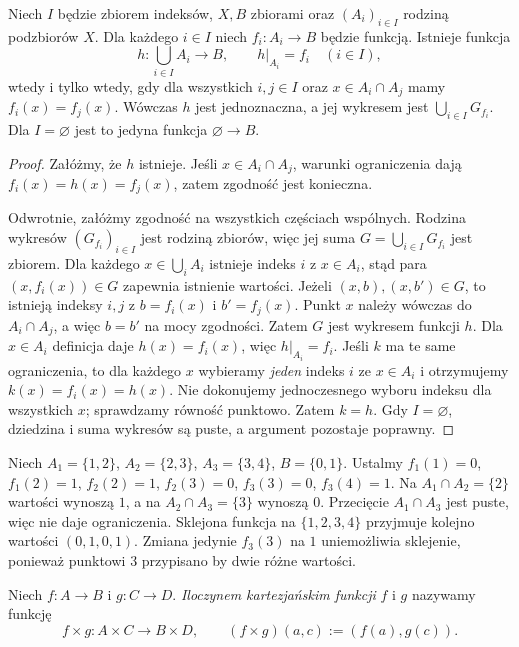 \begin{twierdzenie}
\label{thm:gluing-family-xliv}
Niech $I$ będzie zbiorem indeksów, $X,B$ zbiorami oraz
$(A_i)_{i\in I}$ rodziną podzbiorów $X$. Dla każdego $i\in I$
niech $f_i:A_i\to B$ będzie funkcją. Istnieje funkcja
\[
 h:\bigcup_{i\in I} A_i\longrightarrow B,
 \qquad h|_{A_i}=f_i\quad(i\in I),
\]
wtedy i tylko wtedy, gdy dla wszystkich $i,j\in I$ oraz
$x\in A_i\cap A_j$ mamy $f_i(x)=f_j(x)$.
Wówczas $h$ jest jednoznaczna, a jej wykresem jest
$\bigcup_{i\in I}G_{f_i}$. Dla $I=\varnothing$ jest to
jedyna funkcja $\varnothing\to B$.
\end{twierdzenie}
\begin{proof}
Załóżmy, że $h$ istnieje. Jeśli $x\in A_i\cap A_j$,
warunki ograniczenia dają $f_i(x)=h(x)=f_j(x)$,
zatem zgodność jest konieczna.

Odwrotnie, załóżmy zgodność na wszystkich częściach wspólnych.
Rodzina wykresów $(G_{f_i})_{i\in I}$ jest rodziną zbiorów,
więc jej suma $G=\bigcup_{i\in I}G_{f_i}$ jest zbiorem.
Dla każdego $x\in\bigcup_i A_i$ istnieje indeks $i$
z $x\in A_i$, stąd para $(x,f_i(x))\in G$ zapewnia istnienie
wartości. Jeżeli $(x,b),(x,b')\in G$, to istnieją indeksy
$i,j$ z $b=f_i(x)$ i $b'=f_j(x)$. Punkt $x$ należy
wówczas do $A_i\cap A_j$, a więc $b=b'$ na mocy zgodności.
Zatem $G$ jest wykresem funkcji $h$.
Dla $x\in A_i$ definicja daje $h(x)=f_i(x)$,
więc $h|_{A_i}=f_i$. Jeśli $k$ ma te same ograniczenia,
to dla każdego $x$ wybieramy \emph{jeden} indeks $i$
ze $x\in A_i$ i otrzymujemy $k(x)=f_i(x)=h(x)$.
Nie dokonujemy jednoczesnego wyboru indeksu dla wszystkich $x$;
sprawdzamy równość punktowo. Zatem $k=h$.
Gdy $I=\varnothing$, dziedzina i suma wykresów są puste,
a argument pozostaje poprawny.
\end{proof}
\begin{przyklad}
Niech $A_1=\{1,2\}$, $A_2=\{2,3\}$, $A_3=\{3,4\}$,
$B=\{0,1\}$. Ustalmy
$f_1(1)=0$, $f_1(2)=1$,
$f_2(2)=1$, $f_2(3)=0$,
$f_3(3)=0$, $f_3(4)=1$.
Na $A_1\cap A_2=\{2\}$ wartości wynoszą $1$,
a na $A_2\cap A_3=\{3\}$ wynoszą $0$.
Przecięcie $A_1\cap A_3$ jest puste, więc nie daje
ograniczenia. Sklejona funkcja na $\{1,2,3,4\}$
przyjmuje kolejno wartości $(0,1,0,1)$.
Zmiana jedynie $f_3(3)$ na $1$ uniemożliwia sklejenie,
ponieważ punktowi $3$ przypisano by dwie różne wartości.
\end{przyklad}

\begin{definicja}\label{def:cartesian-product-functions}
Niech $f:A\to B$ i $g:C\to D$. \emph{Iloczynem kartezjańskim funkcji}
$f$ i $g$ nazywamy funkcję
\[
 f\times g:A\times C\to B\times D,
 \qquad
 (f\times g)(a,c):=(f(a),g(c)).
\]
\end{definicja}


